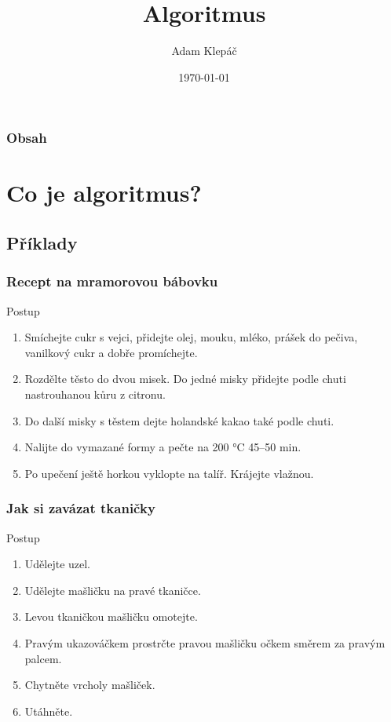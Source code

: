 \documentclass[aspectratio=169,11pt,svgnames,handout]{beamer}
\title{Algoritmus}
\date{\today}
\author{Adam Klepáč}
\institute[GEVO]{Gymnázium Evolution Jižní Město}
\begin{document}
\titleframe

\begin{frame}
 \frametitle{Obsah}
 \tableofcontents
\end{frame}

\section{Co je algoritmus?}
\subsection{Příklady}

\begin{frame}
 \subsectionpage
\end{frame}

\begin{frame}
 \frametitle{Recept na mramorovou bábovku}
 \begin{block}{Postup}
  \begin{enumerate}
   \item Smíchejte cukr s vejci, přidejte olej, mouku, mléko, prášek do pečiva,
    vanilkový cukr a dobře promíchejte.
   \item Rozdělte těsto do dvou misek. Do jedné misky přidejte podle chuti
    nastrouhanou kůru z citronu.
   \item Do další misky s těstem dejte holandské kakao také podle chuti.
   \item Nalijte do vymazané formy a pečte na 200 °C 45–50 min.
   \item Po upečení ještě horkou vyklopte na talíř. Krájejte vlažnou.
  \end{enumerate}
 \end{block}
\end{frame}

\begin{frame}
 \frametitle{Jak si zavázat tkaničky}
 \begin{block}{Postup}
  \begin{enumerate}
   \item Udělejte uzel.
   \item Udělejte mašličku na pravé tkaničce.
   \item Levou tkaničkou mašličku omotejte.
   \item Pravým ukazováčkem prostrčte pravou mašličku očkem směrem za pravým
    palcem.
   \item Chytněte vrcholy mašliček.
   \item Utáhněte.
  \end{enumerate}
 \end{block}
\end{frame}
\end{document}
